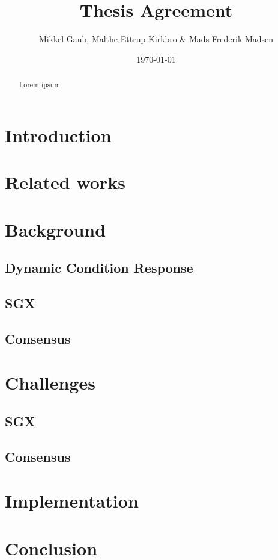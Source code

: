 \documentclass[12pt]{article}
\author{Mikkel Gaub, Malthe Ettrup Kirkbro \& Mads Frederik Madsen}
\title{Thesis Agreement}
\date{\today}
\begin{document}
\maketitle
\thispagestyle{empty}

\vspace{\fill}

\begin{abstract}
Lorem ipsum
\end{abstract}

\pagebreak

\tableofcontents

\pagebreak

	\section{Introduction}

	\section{Related works}

	\section{Background}

		\subsection{Dynamic Condition Response}

		\subsection{SGX}

		\subsection{Consensus}

	\section{Challenges}

		\subsection{SGX}

		\subsection{Consensus}	

	\section{Implementation}

	\section{Conclusion}

	\begin{thebibliography}{9}


	\end{thebibliography}
\end{document}

